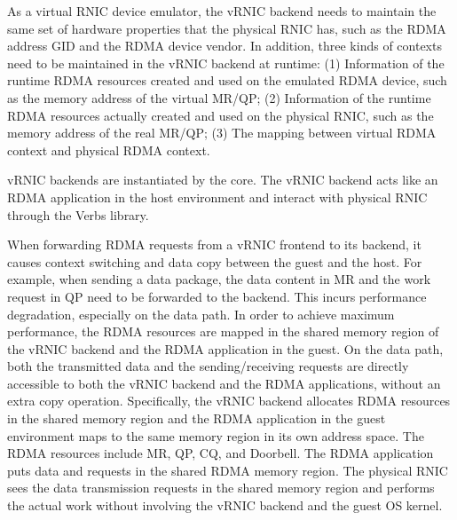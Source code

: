 As a virtual RNIC device emulator, the vRNIC backend needs to maintain the same set of hardware properties that the physical RNIC has, such as the RDMA address GID and the RDMA device vendor. In addition, three kinds of contexts need to be maintained in the vRNIC backend at runtime:
(1) Information of the runtime RDMA resources created and used on the emulated RDMA device, such as the memory address of the virtual MR/QP;
(2) Information of the runtime RDMA resources actually created and used on the physical RNIC, such as the memory address of the real MR/QP;
(3) The mapping between virtual RDMA context and physical RDMA context.

vRNIC backends are instantiated by the \sys core.
The vRNIC backend acts like an RDMA application in the host environment and interact with physical RNIC through the Verbs library.


When forwarding RDMA requests from a vRNIC frontend to its backend, it causes context switching and data copy between the guest and the host. For example, when sending a data package, the data content in MR and the work request in QP need to be forwarded to the backend. This incurs performance degradation, especially on the data path. In order to achieve maximum performance, the RDMA resources are mapped in the shared memory region of the vRNIC backend and the RDMA application in the guest. On the data path, both the transmitted data and the sending/receiving requests are directly accessible to both the vRNIC backend and the RDMA applications, without an extra copy operation. Specifically, the vRNIC backend allocates RDMA resources in the shared memory region and the RDMA application in the guest environment maps to the same memory region in its own address space. The RDMA resources include MR, QP, CQ, and Doorbell. The RDMA application puts data and requests in the shared RDMA memory region. The physical RNIC sees the data transmission requests in the shared memory region and performs the actual work without involving the vRNIC backend and the guest OS kernel.

